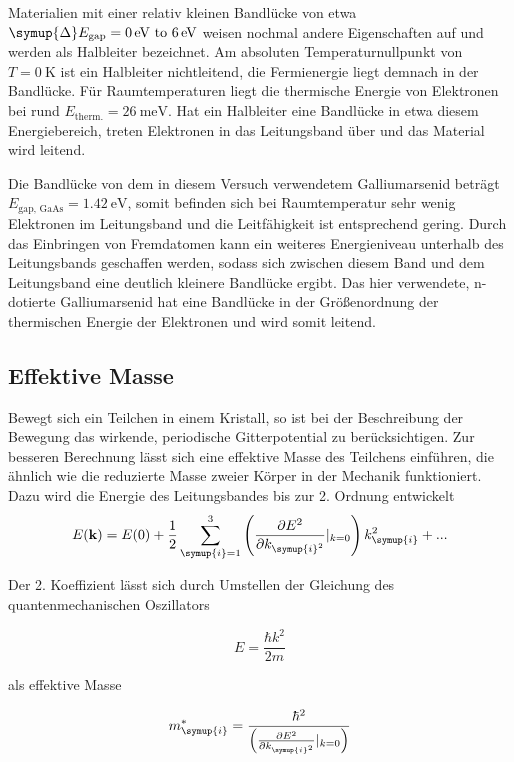 Materialien mit einer relativ kleinen Bandlücke von etwa $\symup{\Delta}E_{\text{gap}}=\qtyrange{0}{6}{\electronvolt}$ weisen nochmal andere Eigenschaften auf und werden als Halbleiter
bezeichnet. Am absoluten Temperaturnullpunkt von $T=\qty{0}{\kelvin}$ ist ein Halbleiter nichtleitend, die Fermienergie liegt demnach in der Bandlücke. Für Raumtemperaturen liegt die
thermische Energie von Elektronen bei rund $E_{\text{therm.}}=\qty{26}{\milli\electronvolt}$. Hat ein Halbleiter eine Bandlücke in etwa diesem Energiebereich, treten Elektronen in das 
Leitungsband über und das Material wird leitend.

Die Bandlücke von dem in diesem Versuch verwendetem Galliumarsenid beträgt $E_{\text{gap, GaAs}} = \qty{1,42}{\electronvolt}$, somit befinden sich bei Raumtemperatur sehr wenig 
Elektronen im Leitungsband und die Leitfähigkeit ist entsprechend gering. Durch das Einbringen von Fremdatomen kann ein weiteres Energieniveau unterhalb des Leitungsbands geschaffen werden,
sodass sich zwischen diesem Band und dem Leitungsband eine deutlich kleinere Bandlücke ergibt. Das hier verwendete, n-dotierte Galliumarsenid hat eine Bandlücke in der Größenordnung der
thermischen Energie der Elektronen und wird somit leitend. 

\subsection{Effektive Masse}
\label{subsec:Effektive Masse}
Bewegt sich ein Teilchen in einem Kristall, so ist bei der Beschreibung der Bewegung das wirkende, periodische Gitterpotential zu berücksichtigen. Zur besseren Berechnung lässt
sich eine effektive Masse des Teilchens einführen, die ähnlich wie die reduzierte Masse zweier Körper in der Mechanik funktioniert.
Dazu wird die Energie des Leitungsbandes bis zur 2. Ordnung entwickelt
\begin{equation*}
    E(\mathbf{k}) = E(0) + \frac{1}{2}\sum_{\symup{i}=1}^{3}\left(\frac{\partial E^2}{\partial k_{\symup{i}^2}}|_{k=0}\right) k_{\symup{i}}^2 + ...
\end{equation*}

Der 2. Koeffizient lässt sich durch Umstellen der Gleichung des quantenmechanischen Oszillators 

\begin{equation*}
    E = \frac{\hbar k^2}{2m}
\end{equation*}

als effektive Masse

\begin{equation*}
    m_{\symup{i}}^{*}=\frac{\hbar^2}{\left(\frac{\partial E^2}{\partial k_{\symup{i}^2}}|_{k=0}\right)}
\end{equation*}

